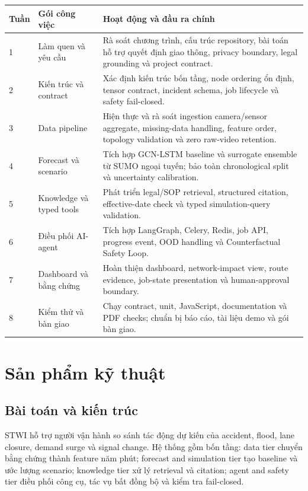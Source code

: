 \documentclass[12pt,a4paper]{report}
\begin{document}
\begin{longtable}{L{1.1cm}L{3.2cm}L{8.7cm}}
\toprule
\textbf{Tuần} & \textbf{Gói công việc} & \textbf{Hoạt động và đầu ra chính}\\
 & Làm quen và yêu cầu & Rà soát chương trình, cấu trúc repository, bài toán hỗ trợ quyết định giao thông, privacy boundary, legal grounding và project contract.\\
2 & Kiến trúc và contract & Xác định kiến trúc bốn tầng, node ordering ổn định, tensor contract, incident schema, job lifecycle và safety fail-closed.\\
3 & Data pipeline & Hiện thực và rà soát ingestion camera/sensor aggregate, missing-data handling, feature order, topology validation và zero raw-video retention.\\
4 & Forecast và scenario & Tích hợp GCN-LSTM baseline và surrogate ensemble từ SUMO ngoại tuyến; bảo toàn chronological split và uncertainty calibration.\\
5 & Knowledge và typed tools & Phát triển legal/SOP retrieval, structured citation, effective-date check và typed simulation-query validation.\\
6 & Điều phối AI-agent & Tích hợp LangGraph, Celery, Redis, job API, progress event, OOD handling và Counterfactual Safety Loop.\\
7 & Dashboard và bằng chứng & Hoàn thiện dashboard, network-impact view, route evidence, job-state presentation và human-approval boundary.\\
8 & Kiểm thử và bàn giao & Chạy contract, unit, JavaScript, documentation và PDF checks; chuẩn bị báo cáo, tài liệu demo và gói bàn giao.\\
\bottomrule
\end{longtable}

\chapter{Sản phẩm kỹ thuật}
\section{Bài toán và kiến trúc}
STWI hỗ trợ người vận hành so sánh tác động dự kiến của accident, flood, lane closure, demand surge và signal change. Hệ thống gồm bốn tầng: data tier chuyển bằng chứng thành feature năm phút; forecast and simulation tier tạo baseline và ước lượng scenario; knowledge tier xử lý retrieval và citation; agent and safety tier điều phối công cụ, tác vụ bất đồng bộ và kiểm tra fail-closed.
\end{document}
